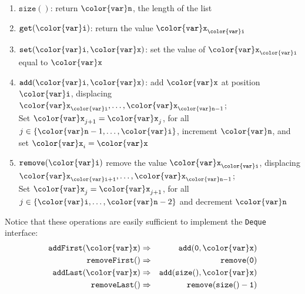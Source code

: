 \documentclass[10pt]{book}
\theoremstyle{plain}
\theoremstyle{definition}
\begin{document}
\begin{enumerate}
  \item \ensuremath{\mathtt{size()}}: return \ensuremath{\mathtt{{\color{var}n}}}, the length of the list
  \item \ensuremath{\mathtt{get({\color{var}i})}}: return the value $\ensuremath{\mathtt{{\color{var}x}}}_{\ensuremath{\mathtt{{\color{var}i}}}}$
  \item \ensuremath{\mathtt{set({\color{var}i},{\color{var}x})}}: set the value of $\ensuremath{\mathtt{{\color{var}x}}}_{\ensuremath{\mathtt{{\color{var}i}}}}$ equal to \ensuremath{\mathtt{{\color{var}x}}}
  \item \ensuremath{\mathtt{add({\color{var}i},{\color{var}x})}}: add \ensuremath{\mathtt{{\color{var}x}}} at position \ensuremath{\mathtt{{\color{var}i}}}, displacing
    $\ensuremath{\mathtt{{\color{var}x}}}_{\ensuremath{\mathtt{{\color{var}i}}}},\ldots,\ensuremath{\mathtt{{\color{var}x}}}_{\ensuremath{\mathtt{{\color{var}n}}}-1}$; \\ 
    Set $\ensuremath{\mathtt{{\color{var}x}}}_{j+1}=\ensuremath{\mathtt{{\color{var}x}}}_j$, for all
    $j\in\{\ensuremath{\mathtt{{\color{var}n}}}-1,\ldots,\ensuremath{\mathtt{{\color{var}i}}}\}$, increment \ensuremath{\mathtt{{\color{var}n}}}, and set $\ensuremath{\mathtt{{\color{var}x}}}_i=\ensuremath{\mathtt{{\color{var}x}}}$
  \item \ensuremath{\mathtt{remove({\color{var}i})}} remove the value $\ensuremath{\mathtt{{\color{var}x}}}_{\ensuremath{\mathtt{{\color{var}i}}}}$, displacing
    $\ensuremath{\mathtt{{\color{var}x}}}_{\ensuremath{\mathtt{{\color{var}i}+1}}},\ldots,\ensuremath{\mathtt{{\color{var}x}}}_{\ensuremath{\mathtt{{\color{var}n}}}-1}$; \\ 
    Set $\ensuremath{\mathtt{{\color{var}x}}}_{j}=\ensuremath{\mathtt{{\color{var}x}}}_{j+1}$, for all
    $j\in\{\ensuremath{\mathtt{{\color{var}i}}},\ldots,\ensuremath{\mathtt{{\color{var}n}}}-2\}$ and decrement \ensuremath{\mathtt{{\color{var}n}}}
\end{enumerate}
Notice that these operations are easily sufficient to implement the
\texttt{Deque} interface:
\begin{eqnarray*}
  \ensuremath{\mathtt{addFirst({\color{var}x})}} &\Rightarrow& \ensuremath{\mathtt{add(0,{\color{var}x})}} \\
  \ensuremath{\mathtt{removeFirst()}} &\Rightarrow& \ensuremath{\mathtt{remove(0)}}  \\
  \ensuremath{\mathtt{addLast({\color{var}x})}} &\Rightarrow& \ensuremath{\mathtt{add(size(),{\color{var}x})}} \\
  \ensuremath{\mathtt{removeLast()}} &\Rightarrow& \ensuremath{\mathtt{remove(size()-1)}}
\end{eqnarray*}
\end{document}
